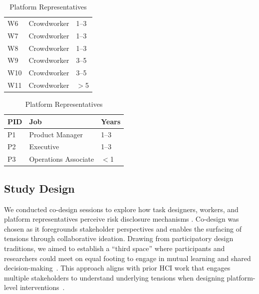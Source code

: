 \begin{table}
\begin{minipage}[b]{0.32\textwidth}
\begin{tabular}{lll}
W6 & Crowdworker & 1--3 \\
W7 & Crowdworker & 1--3 \\
W8 & Crowdworker & 1--3 \\
W9 & Crowdworker & 3--5 \\
W10 & Crowdworker & 3--5 \\
W11 & Crowdworker & $>$5 \\
\bottomrule
\end{tabular}
\caption{Workers}
\label{tab:workers}
\end{minipage}
\hfill
\begin{minipage}[b]{0.32\textwidth}
\fontsize{7pt}{10pt}\selectfont
\centering
\begin{tabular}{lll}
\toprule
\textbf{PID} & \textbf{Job} & \textbf{Years} \\
\midrule
P1 & Product Manager & 1--3 \\
P2 & Executive & 1--3 \\
P3 & Operations Associate & $<$1 \\
\bottomrule
\end{tabular}
\caption{Platform Representatives}
\end{minipage}
\end{table}
\label{tab:platform-reps}



\subsection{Study Design}
We conducted  co-design sessions  to explore how task designers, workers, and platform representatives perceive risk disclosure mechanisms . Co-design was chosen as it foregrounds stakeholder perspectives and enables the surfacing of tensions through collaborative ideation. Drawing from participatory design traditions, we aimed to establish a ``third space'' where participants and researchers could meet on equal footing to engage in mutual learning and shared decision-making~\cite{muller_participatory_nodate, steen2013co, bodker_participatory_2018}. This approach aligns with prior HCI work that engages multiple stakeholders to understand underlying tensions when designing platform-level interventions~\cite{hsieh_designing_2023, tang2024ai}.


